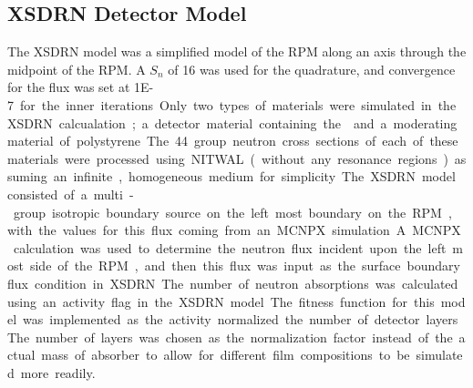 \subsection{XSDRN Detector Model}
The XSDRN model was a simplified model of the RPM along an axis through the midpoint of the RPM.
A $S_n$ of 16 was used for the quadrature, and convergence for the flux was set at \SI{1E-7} for the inner iterations.
Only two types of materials were simulated in the XSDRN calcualation; a detector material containing the  and a moderating material of polystyrene.
The 44 group neutron cross sections of each of these materials were processed using NITWAL (without any resonance regions) assuming an infinite, homogeneous medium for simplicity.
The XSDRN model consisted of a multi-group isotropic boundary source on the left most boundary on the RPM, with the values for this flux coming from an MCNPX simulation.
A MCNPX calculation was used to determine the neutron flux incident upon the left most side of the RPM, and then this flux was input as the surface boundary flux condition in XSDRN.
The number of neutron absorptions was calculated using an activity flag in the XSDRN model.
The fitness function for this model was implemented as the activity normalized the number of detector layers.
The number of layers was chosen as the normalization factor instead of the actual mass of absorber to allow for different film compositions to be simulated more readily.
